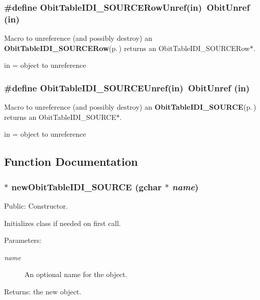 \subsubsection{\setlength{\rightskip}{0pt plus 5cm}\#define Obit\-Table\-IDI\_\-SOURCERow\-Unref(in)\ Obit\-Unref (in)}\label{ObitTableIDI__SOURCE_8h_a4}


Macro to unreference (and possibly destroy) an {\bf Obit\-Table\-IDI\_\-SOURCERow}{\rm (p.\,\pageref{structObitTableIDI__SOURCERow})} returns an Obit\-Table\-IDI\_\-SOURCERow$\ast$. 

in = object to unreference 
\subsubsection{\setlength{\rightskip}{0pt plus 5cm}\#define Obit\-Table\-IDI\_\-SOURCEUnref(in)\ Obit\-Unref (in)}\label{ObitTableIDI__SOURCE_8h_a1}


Macro to unreference (and possibly destroy) an {\bf Obit\-Table\-IDI\_\-SOURCE}{\rm (p.\,\pageref{structObitTableIDI__SOURCE})} returns an Obit\-Table\-IDI\_\-SOURCE$\ast$. 

in = object to unreference 

\subsection{Function Documentation}
\subsubsection{$\ast$ new\-Obit\-Table\-IDI\_\-SOURCE (gchar $\ast$ {\em name})}\label{ObitTableIDI__SOURCE_8h_a11}


Public: Constructor. 

Initializes class if needed on first call. \begin{Desc}
\item[Parameters:]
\begin{description}
\item[{\em name}]An optional name for the object. \end{description}
\end{Desc}
\begin{Desc}
\item[Returns:]the new object. \end{Desc}
